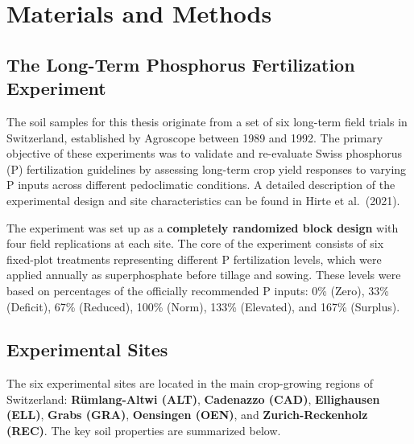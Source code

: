 \documentclass[
  letterpaper,
  DIV=11,
  numbers=noendperiod]{scrartcl}
\begin{document}
\section{Materials and Methods}\label{materials-and-methods}

\subsection{The Long-Term Phosphorus Fertilization
Experiment}\label{the-long-term-phosphorus-fertilization-experiment}

The soil samples for this thesis originate from a set of six long-term
field trials in Switzerland, established by Agroscope between 1989 and
1992. The primary objective of these experiments was to validate and
re-evaluate Swiss phosphorus (P) fertilization guidelines by assessing
long-term crop yield responses to varying P inputs across different
pedoclimatic conditions. A detailed description of the experimental
design and site characteristics can be found in Hirte et al.~(2021).

The experiment was set up as a \textbf{completely randomized block
design} with four field replications at each site. The core of the
experiment consists of six fixed-plot treatments representing different
P fertilization levels, which were applied annually as superphosphate
before tillage and sowing. These levels were based on percentages of the
officially recommended P inputs: 0\% (Zero), 33\% (Deficit), 67\%
(Reduced), 100\% (Norm), 133\% (Elevated), and 167\% (Surplus).

\subsection{Experimental Sites}\label{experimental-sites}

The six experimental sites are located in the main crop-growing regions
of Switzerland: \textbf{Rümlang-Altwi (ALT)}, \textbf{Cadenazzo (CAD)},
\textbf{Ellighausen (ELL)}, \textbf{Grabs (GRA)}, \textbf{Oensingen
(OEN)}, and \textbf{Zurich-Reckenholz (REC)}. The key soil properties
are summarized below.
\end{document}
